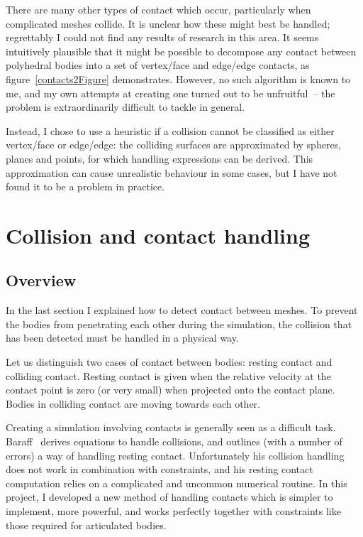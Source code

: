 There are many other types of contact which occur, particularly when complicated meshes
collide. It is unclear how these might best be handled; regrettably I could not find any results
of research in this area. It seems intuitively plausible that it might be possible to decompose any
contact between polyhedral bodies into a set of vertex/face and edge/edge contacts, as
figure~\ref{contacts2Figure} demonstrates. However, no such algorithm is known to me, and my own
attempts at creating one turned out to be unfruitful~-- the problem is extraordinarily difficult
to tackle in general.

Instead, I chose to use a heuristic if a collision cannot be classified as either vertex/face or
edge/edge: the colliding surfaces are approximated by spheres, planes and points, for which
handling expressions can be derived. This approximation can cause unrealistic behaviour in some
cases, but I have not found it to be a problem in practice.


\section{Collision and contact handling\label{collisionHandling}}

\subsection{Overview}

In the last section I explained how to detect contact between meshes. To prevent the bodies from
penetrating each other during the simulation, the collision that has been detected must be
handled in a physical way.

Let us distinguish two cases of contact between bodies: resting contact and colliding contact.
Resting contact is given when the relative velocity at the contact point is zero (or very small)
when projected onto the contact plane. Bodies in colliding contact are moving towards each other.

Creating a simulation involving contacts is generally seen as a difficult task.
Baraff~\cite{BaraffWitkin:97} derives equations to handle collisions, and outlines (with a number
of errors) a way of handling resting contact. Unfortunately his collision handling does not work
in combination with constraints, and his resting contact computation relies on a complicated and
uncommon numerical routine. In this project, I developed a new method of handling contacts which
is simpler to implement, more powerful, and works perfectly together with constraints like those
required for articulated bodies.

